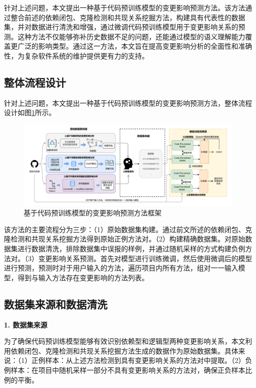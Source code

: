 针对上述问题，本文提出一种基于代码预训练模型的变更影响预测方法。该方法通过整合前述的依赖闭包、克隆检测和共现关系挖掘方法，构建具有代表性的数据集，并对数据进行清洗和增强，通过微调代码预训练模型用于变更影响关系的预测。这种方法不仅能够弥补历史数据不足的问题，还能通过模型的语义理解能力覆盖更广泛的影响类型。通过这一方法，本文旨在提高变更影响分析的全面性和准确性，为复杂软件系统的维护提供更有力的支持。


\subsection{整体流程设计}

针对上述问题，本文提出一种基于代码预训练模型的变更影响预测方法，整体流程设计如图\ref{2_基于代码预训练模型的变更影响预测方法框架}所示。

\begin{figure}[htbp]
\centering
\includegraphics[width = 1\textwidth]{figures/2_预训练模型.pdf}
\caption{基于代码预训练模型的变更影响预测方法框架}
\label{2_基于代码预训练模型的变更影响预测方法框架}
\end{figure}

该方法的主要流程分为三步：（1）原始数据集构建。通过前文所述的依赖闭包、克隆检测和共现关系挖掘方法得到原始正例方法对。（2）构建精确数据集。对原始数据集进行数据清洗，排除数据集中误报的样例，并通过随机采样的方式构建负例方法对。（3）变更影响关系预测。首先对模型进行训练微调，然后使用微调后的模型进行预测，预测时对于用户输入的方法，遍历项目内所有方法，组对一一输入模型，得到与输入方法存在变更影响的方法列表。



\subsection{数据集来源和数据清洗}
\label{1_数据集来源和数据清洗}


\noindent \textbf{1. 数据集来源}

为了确保代码预训练模型能够有效识别依赖型和逻辑型两种变更影响关系，本文利用依赖闭包、克隆检测和共现关系挖掘方法生成的数据作为原始数据集。具体来说：（1）正例样本：从上述方法检测到具有变更影响关系的方法对中提取。（2）负例样本：在项目中随机采样一部分不具有变更影响关系的方法对，确保正负样本比例的平衡。

